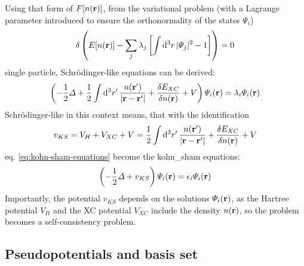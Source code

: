 \documentclass[main.tex]{subfiles}
\begin{document}
Using that form of \(F[n(\vb{r})]\), from the variational problem (with a Lagrange parameter introduced to ensure the orthonormality of the states \(\Psi_i\))
\begin{align}
     \delta \left( E [n(\vb{r})] - \sum_j \lambda_j \left[\int \dd[3]{r} \vert \Psi_j \vert^2 - 1 \right] \right) = 0
\end{align}
single particle, Schrödinger-like equations can be derived:
\begin{equation}\label{eq:kohn-sham-equations}
    \left(-\frac{1}{2} \Delta + \frac{1}{2} \int \dd[3]{r^{\prime}} \frac{n(\vb{r}^{\prime})}{\vert \vb{r} - \vb{r}^{\prime} \vert} + \fdv{E_{XC}}{n(\vb{r})} + V\right) \Psi_i (\vb{r}) = \lambda_i \Psi_i (\vb{r})
\end{equation}
Schrödinger-like in this context means, that with the identification
\begin{equation}
    v_{KS} = V_H + V_{XC} + V = \frac{1}{2} \int \dd[3]{r^{\prime}} \frac{n(\vb{r}^{\prime})}{\vert \vb{r} - \vb{r}^{\prime} \vert} + \fdv{E_{XC}}{n(\vb{r})} + V
\end{equation}
eq. \ref{eq:kohn-sham-equations} become the \acrshort{kohn_sham} equations:
\begin{equation}
    \left(- \frac{1}{2} \Delta + v_{KS}\right) \Psi_i (\vb{r}) = \epsilon_i \Psi_i (\vb{r})
\end{equation}
Importantly, the potential \(v_{KS}\) depends on the solutions \(\Psi_i (\vb{r})\), as the Hartree potential \(V_H\) and the XC potential \(V_{XC}\) include the density \(n(\vb{r})\), so the problem becomes a self-consistency problem.


\subsection{Pseudopotentials and basis set}\label{sub:theory_basis_set}
\end{document}
